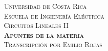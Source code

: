 %
%
%

\begin{titlepage}
  \vspace*{\fill}
  \begin{center}

    \textsc{\Large Universidad de Costa Rica}\\
    [0.25in]

    \textsc{\Large Escuela de Ingienería Eléctrica}\\
    [0.55in]

    \textsc{\Large Circuitos Lineales II}\\
    [0.25in]

    \textsc{\huge \bfseries Apuntes de la materia}\\
    [0.5in]

    \textsc{\large Transcripción por Emilio Rojas}

  \end{center}
  \vspace*{\fill}
\end{titlepage}
